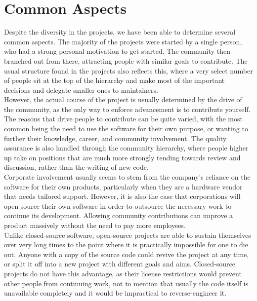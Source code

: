 \section{Common Aspects}
Despite the diversity in the projects, we have been able to determine several common aspects. The majority of the projects were started by a single person, who had a strong personal motivation to get started. The community then branched out from there, attracting people with similar goals to contribute. The usual structure found in the projects also reflects this, where a very select number of people sit at the top of the hierarchy and make most of the important decisions and delegate smaller ones to maintainers. \\

However, the actual course of the project is usually determined by the drive of the community, as the only way to enforce advancement is to contribute yourself. The reasons that drive people to contribute can be quite varied, with the most common being the need to use the software for their own purpose, or wanting to further their knowledge, career, and community involvement. The quality assurance is also handled through the community hierarchy, where people higher up take on positions that are much more strongly tending towards review and discussion, rather than the writing of new code. \\

Corporate involvement usually seems to stem from the company's reliance on the software for their own products, particularly when they are a hardware vendor that needs tailored support. However, it is also the case that corporations will open-source their own software in order to outsource the necessary work to continue its development. Allowing community contributions can improve a product massively without the need to pay more employees. \\

Unlike closed-source software, open-source projects are able to sustain themselves over very long times to the point where it is practically impossible for one to die out. Anyone with a copy of the source code could revive the project at any time, or split it off into a new project with different goals and aims. Closed-source projects do not have this advantage, as their license restrictions would prevent other people from continuing work, not to mention that usually the code itself is unavailable completely and it would be impractical to reverse-engineer it.


